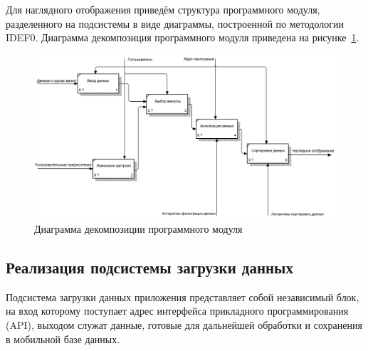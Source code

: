Для наглядного отображения приведём структура программного модуля,
разделенного на подсистемы в виде диаграммы, построенной по методологии IDEF0.
Диаграмма декомпозиция программного модуля приведена
на рисунке~\ref{fig:idef0_structure}.
\begin{figure}[h!]
  \centering
  \includegraphics[width=160mm]{fig/IDEF0_structure}
  \caption{Диаграмма декомпозиции программного модуля}
  \label{fig:idef0_structure}
\end{figure}



\newpage



\subsection{Реализация подсистемы загрузки данных}
\label{subs:realization_network_requests}

Подсистема загрузки данных приложения представляет собой независимый блок,
на вход которому поступает адрес интерфейса прикладного программирования (API),
выходом служат данные, готовые для дальнейшей обработки и сохранения
в мобильной базе данных.

